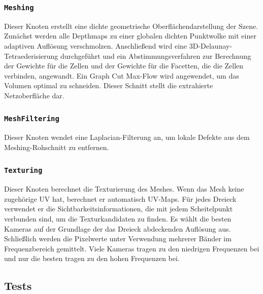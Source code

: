 \documentclass[german,notitlepage,smartquotes]{hgbreport}
\begin{document}
\subsubsection{\texttt{Meshing}}

Dieser Knoten erstellt eine dichte geometrische Oberflächendarstellung der Szene.
Zunächst werden alle Depthmaps zu einer globalen dichten Punktwolke mit einer adaptiven Auflösung verschmolzen. Anschließend wird eine 3D-Delaunay-Tetraederisierung durchgeführt und ein Abstimmungsverfahren zur Berechnung der Gewichte für die Zellen und der Gewichte für die Facetten, die die Zellen verbinden, angewandt. Ein Graph Cut Max-Flow wird angewendet, um das Volumen optimal zu schneiden. Dieser Schnitt stellt die extrahierte Netzoberfläche dar.

\subsubsection{\texttt{MeshFiltering}}

Dieser Knoten wendet eine Laplacian-Filterung an, um lokale Defekte aus dem Meshing-Rohschnitt zu entfernen.

\subsubsection{\texttt{Texturing}}

Dieser Knoten berechnet die Texturierung des Meshes.
Wenn das Mesh keine zugehörige UV hat, berechnet er automatisch UV-Maps.
Für jedes Dreieck verwendet er die Sichtbarkeitsinformationen, die mit jedem Scheitelpunkt verbunden sind, um die Texturkandidaten zu finden. Es wählt die besten Kameras auf der Grundlage der das Dreieck abdeckenden Auflösung aus. Schließlich werden die Pixelwerte unter Verwendung mehrerer Bänder im Frequenzbereich gemittelt. Viele Kameras tragen zu den niedrigen Frequenzen bei und nur die besten tragen zu den hohen Frequenzen bei.


\clearpage

\subsection{Tests}
\end{document}
